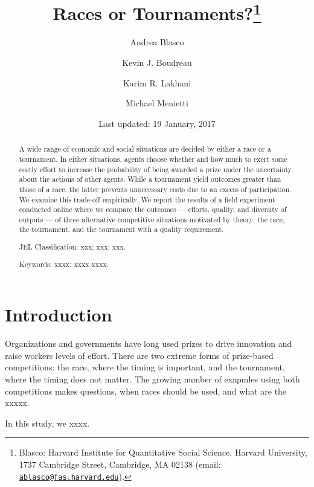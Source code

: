 \documentclass[12pt,]{article}
\title{Races or Tournaments?\thanks{Blasco: Harvard Institute for Quantitative Social Science, Harvard
University, 1737 Cambridge Street, Cambridge, MA 02138 (email:
\href{mailto:ablasco@fas.harvard.edu}{\nolinkurl{ablasco@fas.harvard.edu}}).}}
\author{Andrea Blasco \and Kevin J. Boudreau \and Karim R. Lakhani \and Michael Menietti}
\date{Last updated: 19 January, 2017}
\begin{document}
\maketitle
\begin{abstract}
A wide range of economic and social situations are decided by either a
race or a tournament. In either situations, agents choose whether and
how much to exert some costly effort to increase the probability of
being awarded a prize under the uncertainty about the actions of other
agents. While a tournament yield outcomes greater than those of a race,
the latter prevents unnecessary costs due to an excess of participation.
We examine this trade-off empirically. We report the results of a field
experiment conducted online where we compare the outcomes --- efforts,
quality, and diversity of outputs --- of three alternative competitive
situations motivated by theory: the race, the tournament, and the
tournament with a quality requirement.

\smallskip\noindent 
JEL Classification: xxx; xxx; xxx.

\smallskip\noindent 
Keywords: xxxx; xxxx xxxx.
\end{abstract}


\clearpage
\tableofcontents
\setcounter{tocdepth}{2}
\clearpage

\section{Introduction}\label{introduction}

Organizations and governments have long used prizes to drive innovation
and raise workers levels of effort. There are two extreme forms of
prize-based competitions: the race, where the timing is important, and
the tournament, where the timing does not matter. The growing number of
exapmles using both competitions makes questions, when races should be
used, and what are the xxxxx.

In this study, we xxxx.
\end{document}
